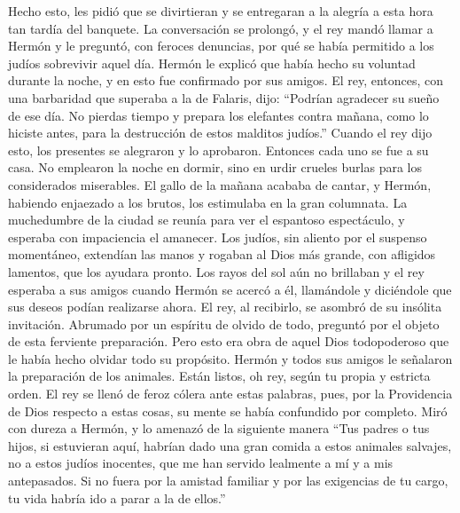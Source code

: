 Hecho esto, les pidió que se divirtieran y se entregaran a la alegría a
esta hora tan tardía del banquete.  La conversación se
prolongó, y el rey mandó llamar a Hermón y le preguntó, con feroces
denuncias, por qué se había permitido a los judíos sobrevivir aquel día.
 Hermón le explicó que había hecho su voluntad durante la
noche, y en esto fue confirmado por sus amigos.  El rey,
entonces, con una barbaridad que superaba a la de Falaris, dijo:
``Podrían agradecer su sueño de ese día. No pierdas tiempo y prepara los
elefantes contra mañana, como lo hiciste antes, para la destrucción de
estos malditos judíos.''  Cuando el rey dijo esto, los
presentes se alegraron y lo aprobaron. Entonces cada uno se fue a su
casa.  No emplearon la noche en dormir, sino en urdir
crueles burlas para los considerados miserables.  El
gallo de la mañana acababa de cantar, y Hermón, habiendo enjaezado a los
brutos, los estimulaba en la gran columnata.  La
muchedumbre de la ciudad se reunía para ver el espantoso espectáculo, y
esperaba con impaciencia el amanecer.  Los judíos, sin
aliento por el suspenso momentáneo, extendían las manos y rogaban al
Dios más grande, con afligidos lamentos, que los ayudara pronto.
 Los rayos del sol aún no brillaban y el rey esperaba a
sus amigos cuando Hermón se acercó a él, llamándole y diciéndole que sus
deseos podían realizarse ahora.  El rey, al recibirlo, se
asombró de su insólita invitación. Abrumado por un espíritu de olvido de
todo, preguntó por el objeto de esta ferviente preparación.
 Pero esto era obra de aquel Dios todopoderoso que le
había hecho olvidar todo su propósito.  Hermón y todos
sus amigos le señalaron la preparación de los animales. Están listos, oh
rey, según tu propia y estricta orden.  El rey se llenó
de feroz cólera ante estas palabras, pues, por la Providencia de Dios
respecto a estas cosas, su mente se había confundido por completo. Miró
con dureza a Hermón, y lo amenazó de la siguiente manera 
``Tus padres o tus hijos, si estuvieran aquí, habrían dado una gran
comida a estos animales salvajes, no a estos judíos inocentes, que me
han servido lealmente a mí y a mis antepasados.  Si no
fuera por la amistad familiar y por las exigencias de tu cargo, tu vida
habría ido a parar a la de ellos.''

